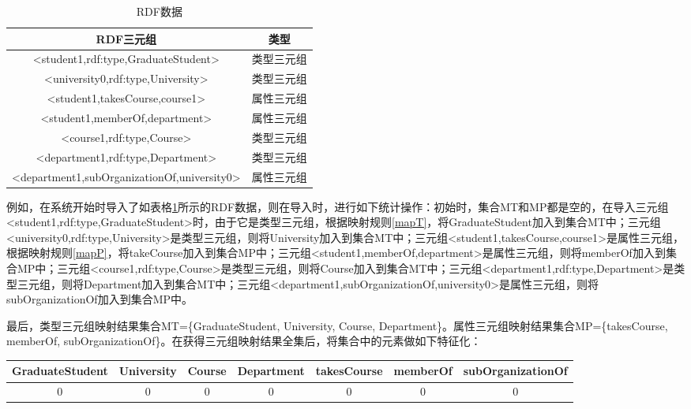 \begin{table}[htbp]
    \caption[table1]{RDF数据}
    \label{RDF2}
    \vspace{0.5em}\centering\wuhao
    \begin{tabular}{|c|c|}
    \toprule[1.5pt]
    RDF三元组& 类型\\
    \midrule[1pt]    
    <student1,rdf:type,GraduateStudent>&类型三元组\\
    <university0,rdf:type,University>&类型三元组\\
    <student1,takesCourse,course1>&属性三元组\\
    <student1,memberOf,department>&属性三元组\\
    <course1,rdf:type,Course>&类型三元组\\
    <department1,rdf:type,Department>&类型三元组\\
    <department1,subOrganizationOf,university0>&属性三元组\\
    \bottomrule[1.5pt]
    \end{tabular}
\end{table}

例如，在系统开始时导入了如表格\ref{RDF2}所示的RDF数据，则在导入时，进行如下统计操作：初始时，集合MT和MP都是空的，在导入三元组<student1,rdf:type,GraduateStudent>时，由于它是类型三元组，根据映射规则\ref{mapT}，将GraduateStudent加入到集合MT中；三元组<university0,rdf:type,University>是类型三元组，则将University加入到集合MT中；三元组<student1,takesCourse,course1>是属性三元组，根据映射规则\ref{mapP}，将takeCourse加入到集合MP中；三元组<student1,memberOf,department>是属性三元组，则将memberOf加入到集合MP中；三元组<course1,rdf:type,Course>是类型三元组，则将Course加入到集合MT中；三元组<department1,rdf:type,Department>是类型三元组，则将Department加入到集合MT中；三元组<department1,subOrganizationOf,university0>是属性三元组，则将subOrganizationOf加入到集合MP中。

最后，类型三元组映射结果集合MT=\{GraduateStudent, University, Course, Department\}。属性三元组映射结果集合MP=\{takesCourse, memberOf, subOrganizationOf\}。在获得三元组映射结果全集后，将集合中的元素做如下特征化：
\begin{table}[htbp]    
    \vspace{0.5em}\centering\wuhao
    \begin{tabular}{ccccccc}
    \toprule[1.5pt]
    GraduateStudent& University&Course&Department&takesCourse&memberOf&subOrganizationOf\\
    \midrule[1pt]    
    0&0&0&0&0&0&0\\
    \bottomrule[1.5pt]
    \end{tabular}
\end{table}

